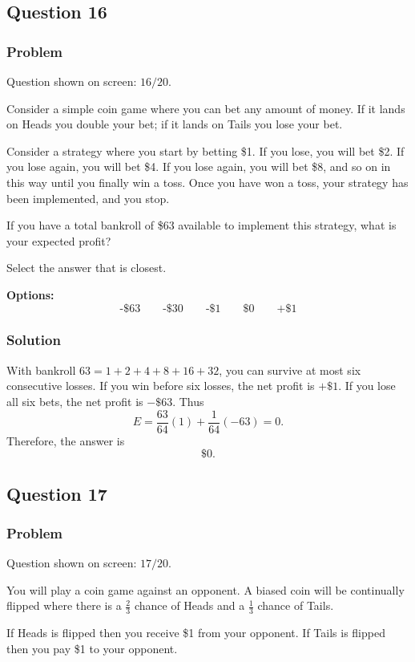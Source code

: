 \documentclass[12pt]{article}
\begin{document}
\subsection{Question 16}
\subsubsection{Problem}
Question shown on screen: \(16/20\).

Consider a simple coin game where you can bet any amount of money. If it lands on Heads you double your bet; if it lands on Tails you lose your bet.

Consider a strategy where you start by betting \$1. If you lose, you will bet \$2. If you lose again, you will bet \$4. If you lose again, you will bet \$8, and so on in this way until you finally win a toss. Once you have won a toss, your strategy has been implemented, and you stop.

If you have a total bankroll of \$63 available to implement this strategy, what is your expected profit?

Select the answer that is closest.

\noindent\textbf{Options:}
\[
\boxed{\text{-\$63}}
\qquad
\boxed{\text{-\$30}}
\qquad
\boxed{\text{-\$1}}
\qquad
\boxed{\text{\$0}}
\qquad
\boxed{\text{+\$1}}
\]

\subsubsection{Solution}
With bankroll \(63=1+2+4+8+16+32\), you can survive at most six consecutive losses. If you win before six losses, the net profit is \(+\$1\). If you lose all six bets, the net profit is \(-\$63\). Thus
\[
E=\frac{63}{64}(1)+\frac{1}{64}(-63)=0.
\]
Therefore, the answer is
\[
\boxed{\text{\$0}}.
\]

\subsection{Question 17}
\subsubsection{Problem}
Question shown on screen: \(17/20\).

You will play a coin game against an opponent. A biased coin will be continually flipped where there is a \(\frac{2}{3}\) chance of Heads and a \(\frac{1}{3}\) chance of Tails.

If Heads is flipped then you receive \$1 from your opponent. If Tails is flipped then you pay \$1 to your opponent.
\end{document}
